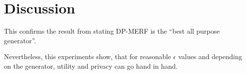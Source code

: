 \section{Discussion}

This confirms the result from \parencite{hu2023sok} stating DP-MERF is the ``best all purpose generator''.

Nevertheless, this experiments show, that for reasonable $\epsilon$ values and depending on the generator, utility and privacy can go hand in hand. 